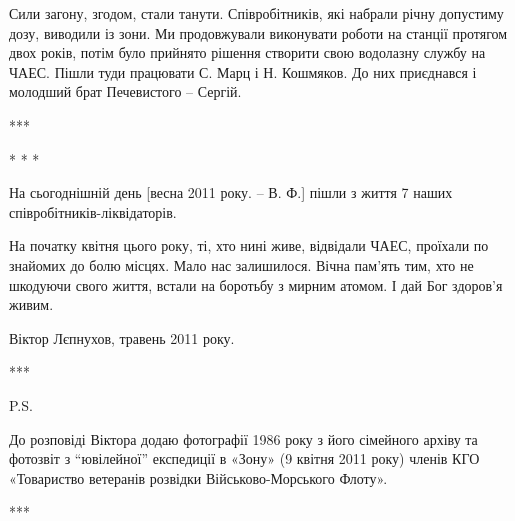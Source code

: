 
Сили загону, згодом, стали танути. Співробітників, які набрали річну допустиму
дозу, виводили із зони. Ми продовжували виконувати роботи на станції протягом
двох років, потім було прийнято рішення створити свою водолазну службу на ЧАЕС.
Пішли туди працювати С. Марц і Н. Кошмяков. До них приєднався і молодший брат
Печевистого – Сергій.


***

* * *

На сьогоднішній день [весна 2011 року. – В. Ф.] пішли з життя 7 наших
співробітників-ліквідаторів. 


На початку квітня цього року, ті, хто нині живе, відвідали ЧАЕС, проїхали по
знайомих до болю місцях. Мало нас залишилося. Вічна пам'ять тим, хто не
шкодуючи свого життя, встали на боротьбу з мирним атомом. І дай Бог здоров'я
живим.

Віктор Лєпнухов, травень 2011 року.

***

P.S.

До розповіді Віктора додаю фотографії 1986 року з його сімейного архіву та
фотозвіт з \enquote{ювілейної} експедиції в «Зону» (9 квітня 2011 року) членів КГО
«Товариство ветеранів розвідки Військово-Морського Флоту».

***

